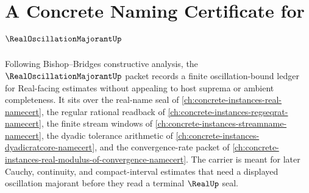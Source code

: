 \chapter{A Concrete Naming Certificate for $\RealOscillationMajorantUp$}
\label{ch:concrete-instances-real-oscillation-majorant-namecert}

Following Bishop--Bridges constructive analysis, the $\RealOscillationMajorantUp$ packet records a finite oscillation-bound ledger for Real-facing estimates without appealing to host suprema or ambient completeness. It sits over the real-name seal of \autoref{ch:concrete-instances-real-namecert}, the regular rational readback of \autoref{ch:concrete-instances-regseqrat-namecert}, the finite stream windows of \autoref{ch:concrete-instances-streamname-namecert}, the dyadic tolerance arithmetic of \autoref{ch:concrete-instances-dyadicratcore-namecert}, and the convergence-rate packet of \autoref{ch:concrete-instances-real-modulus-of-convergence-namecert}. The carrier is meant for later Cauchy, continuity, and compact-interval estimates that need a displayed oscillation majorant before they read a terminal $\RealUp$ seal.


